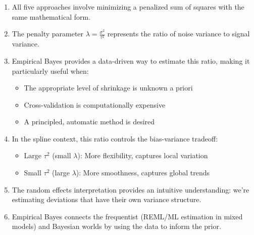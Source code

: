 \documentclass[11pt]{article}
\begin{document}
\begin{enumerate}
    \item All five approaches involve minimizing a penalized sum of squares with the same mathematical form.
    \item The penalty parameter $\lambda = \frac{\sigma^2}{\tau^2}$ represents the ratio of noise variance to signal variance.
    \item Empirical Bayes provides a data-driven way to estimate this ratio, making it particularly useful when:
    \begin{itemize}
        \item The appropriate level of shrinkage is unknown a priori
        \item Cross-validation is computationally expensive
        \item A principled, automatic method is desired
    \end{itemize}
    \item In the spline context, this ratio controls the bias-variance tradeoff:
    \begin{itemize}
        \item Large $\tau^2$ (small $\lambda$): More flexibility, captures local variation
        \item Small $\tau^2$ (large $\lambda$): More smoothness, captures global trends
    \end{itemize}
    \item The random effects interpretation provides an intuitive understanding: we're estimating deviations that have their own variance structure.
    \item Empirical Bayes connects the frequentist (REML/ML estimation in mixed models) and Bayesian worlds by using the data to inform the prior.
\end{enumerate}
\end{document}
